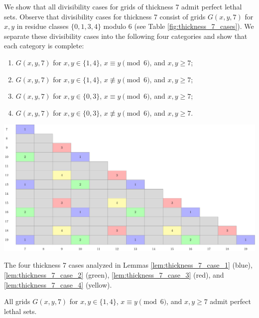 We show that all divisibility cases for grids of thickness 7 admit perfect lethal sets. Observe that divisibility cases for thickness 7 consist of grids $G(x,y,7)$ for $x,y$ in residue classes $\{0,1,3,4\}$ modulo 6 (see Table \ref{fig:thickness_7_cases}). We separate these divisibility cases into the following four categories and show that each category is complete:
\begin{enumerate}
\item $G(x,y,7)$ for $x,y \in \{1,4\}$, $x \equiv y \pmod 6$, and $x,y \geq 7$;
\item $G(x,y,7)$ for $x,y \in \{1,4\}$, $x \not\equiv y \pmod 6$, and $x,y \geq 7$;
\item $G(x,y,7)$ for $x,y \in \{0,3\}$, $x \equiv y \pmod 6$, and $x,y \geq 7$;
\item $G(x,y,7)$ for $x,y \in \{0,3\}$, $x \not\equiv y \pmod 6$, and $x,y \geq 7$.
\end{enumerate}

\begin{table}[]
\centering
\includegraphics[width=\textwidth]{tables/4/thickness_7_cases.pdf}
\caption{The four thickness 7 cases analyzed in Lemmas \ref{lem:thickness_7_case_1} (blue), \ref{lem:thickness_7_case_2} (green), \ref{lem:thickness_7_case_3} (red), and \ref{lem:thickness_7_case_4} (yellow).}
\label{fig:thickness_7_cases}
\end{table}

\begin{lem}
\label{lem:thickness_7_case_1}
All grids $G(x,y,7)$ for $x,y \in \{1,4\}$, $x \equiv y \pmod 6$, and $x,y \geq 7$ admit perfect lethal sets.
\end{lem}

